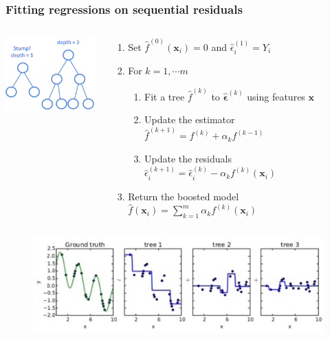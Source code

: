 \documentclass[xcolor={dvipsnames}]{beamer}
\begin{document}
\frame
{
 \frametitle{Fitting regressions on sequential residuals}

\begin{columns}
\begin{column}{.3\textwidth}

\includegraphics[width=1.5in]{stuff/stump.png}

\end{column}
\begin{column}{.75\textwidth}

\footnotesize
 \begin{enumerate}
 \item<2-> Set $\hat f^{(0)}({\boldsymbol x}_i)=0$ and  $\hat \epsilon^{(1)}_i = Y_i$

 \item<3-> For $k = 1, \cdots m$ \\ 
 \begin{enumerate}
\footnotesize
\item<4-> Fit a tree $\hat f^{(k)}$ to $\hat {\boldsymbol \epsilon}^{(k)}$ using features ${\boldsymbol x}$
\item<5-> Update the estimator $\hat f^{(k+1)} = f^{(k)} + \alpha_k f^{(k-1)}$
\item<6-> Update the residuals $\hat \epsilon^{(k+1)}_i = \hat \epsilon^{(k)}_i -  \alpha_k f^{(k)}({\boldsymbol x}_i)$
\end{enumerate}
\item<7-> Return the boosted model $\hat f({\boldsymbol x}_i) = \sum_{k=1}^m \alpha_k f^{(k)}({\boldsymbol x}_i)$ 
\end{enumerate}

\end{column}
\end{columns}


\begin{figure}
\centering
\hspace*{-.35in}\includegraphics[width=4.85in]{stuff/residualsgradient.png}
\end{figure}

}
\end{document}
